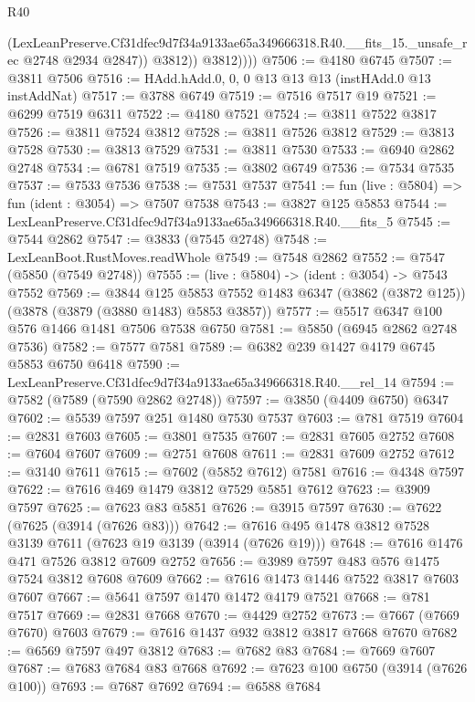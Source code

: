 \begin{lexlean}{R40}
\begin{coremodule}
                  (LexLeanPreserve.Cf31dfec9d7f34a9133ae65a349666318.R40.__fits_15._unsafe_rec
                    @2748
                    @2934
                    @2847))
                @3812))
            @3812))))
@7506 := @4180 @6745
@7507 := @3811 @7506
@7516 := HAdd.hAdd.{0, 0, 0} @13 @13 @13 (instHAdd.{0} @13 instAddNat)
@7517 := @3788 @6749
@7519 := @7516 @7517 @19
@7521 := @6299 @7519 @6311
@7522 := @4180 @7521
@7524 := @3811 @7522 @3817
@7526 := @3811 @7524 @3812
@7528 := @3811 @7526 @3812
@7529 := @3813 @7528
@7530 := @3813 @7529
@7531 := @3811 @7530
@7533 := @6940 @2862 @2748
@7534 := @6781 @7519
@7535 := @3802 @6749
@7536 := @7534 @7535
@7537 := @7533 @7536
@7538 := @7531 @7537
@7541 := fun (live : @5804) => fun (ident : @3054) => @7507 @7538
@7543 := @3827 @125 @5853
@7544 := LexLeanPreserve.Cf31dfec9d7f34a9133ae65a349666318.R40.__fits_5
@7545 := @7544 @2862
@7547 := @3833 (@7545 @2748)
@7548 := LexLeanBoot.RustMoves.readWhole
@7549 := @7548 @2862
@7552 := @7547 (@5850 (@7549 @2748))
@7555 := (live : @5804) -> (ident : @3054) -> @7543 @7552
@7569 := @3844
    @125
    @5853
    @7552
    @1483
    @6347
    (@3862 (@3872 @125))
    (@3878 (@3879 (@3880 @1483) @5853 @3857))
@7577 := @5517 @6347 @100 @576 @1466 @1481 @7506 @7538 @6750
@7581 := @5850 (@6945 @2862 @2748 @7536)
@7582 := @7577 @7581
@7589 := @6382 @239 @1427 @4179 @6745 @5853 @6750 @6418
@7590 := LexLeanPreserve.Cf31dfec9d7f34a9133ae65a349666318.R40.__rel_14
@7594 := @7582 (@7589 (@7590 @2862 @2748))
@7597 := @3850 (@4409 @6750) @6347
@7602 := @5539 @7597 @251 @1480 @7530 @7537
@7603 := @781 @7519
@7604 := @2831 @7603
@7605 := @3801 @7535
@7607 := @2831 @7605 @2752
@7608 := @7604 @7607
@7609 := @2751 @7608
@7611 := @2831 @7609 @2752
@7612 := @3140 @7611
@7615 := @7602 (@5852 @7612) @7581
@7616 := @4348 @7597
@7622 := @7616 @469 @1479 @3812 @7529 @5851 @7612
@7623 := @3909 @7597
@7625 := @7623 @83 @5851
@7626 := @3915 @7597
@7630 := @7622 (@7625 (@3914 (@7626 @83)))
@7642 := @7616 @495 @1478 @3812 @7528 @3139 @7611 (@7623 @19 @3139 (@3914 (@7626 @19)))
@7648 := @7616 @1476 @471 @7526 @3812 @7609 @2752
@7656 := @3989 @7597 @483 @576 @1475 @7524 @3812 @7608 @7609
@7662 := @7616 @1473 @1446 @7522 @3817 @7603 @7607
@7667 := @5641 @7597 @1470 @1472 @4179 @7521
@7668 := @781 @7517
@7669 := @2831 @7668
@7670 := @4429 @2752
@7673 := @7667 (@7669 @7670) @7603
@7679 := @7616 @1437 @932 @3812 @3817 @7668 @7670
@7682 := @6569 @7597 @497 @3812
@7683 := @7682 @83
@7684 := @7669 @7607
@7687 := @7683 @7684 @83 @7668
@7692 := @7623 @100 @6750 (@3914 (@7626 @100))
@7693 := @7687 @7692
@7694 := @6588 @7684

\end{coremodule}
\end{lexlean}
